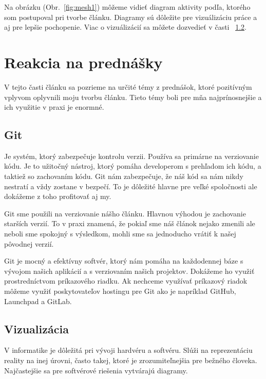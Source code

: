 \documentclass[10pt,twoside,slovak,a4paper]{article}
\begin{document}
Na obrázku (Obr.~\ref{fig:mesh1}) môžeme vidieť diagram aktivity podľa, ktorého som postupoval pri tvorbe článku. Diagramy sú dôležite pre vizuálizáciu práce a aj pre lepšie pochopenie. Viac o vizuálizácií sa môžete dozvedieť v časti ~\ref{viz}.

\newpage


\hypertarget{reakcia-na-prednasky}{%
\section{\texorpdfstring{Reakcia na prednášky
}{Reakcia na prednášky }}\label{reakcia-na-prednasky}}

V tejto časti článku sa pozrieme na určité témy z prednášok, ktoré pozitívným vplyvom oplyvnili moju tvorbu článku. Tieto témy boli pre mňa najprínosnejšie a ich využitie v praxi je enormné.
\hypertarget{git}{%
\subsection{Git}\label{git}}

Je systém, ktorý zabezpečuje kontrolu verzii. Používa sa primárne na verziovanie kódu. Je to užitočný nástroj, ktorý pomáha developerom s prehľadom ich kódu, a taktiež so zachovaním kódu. Git nám zabezpečuje, že náš kód sa nám nikdy nestratí a vždy zostane v bezpečí. To je dôležité hlavne pre veľké spoločnosti ale dokážeme z toho profitovať aj my. 

Git sme použili na verziovanie nášho článku. Hlavnou výhodou je zachovanie starších verzií. To v praxi znamená, že pokiaľ sme náš článok nejako zmenili ale neboli sme spokojný s výsledkom, mohli sme sa jednoducho vrátiť k našej pôvodnej verzií. 

Git je mocný a efektívny softvér, ktorý nám pomáha na každodennej báze s vývojom našich aplikácií a s verziovaním našich projektov. Dokážeme ho využiť prostredníctvom príkazového riadku. Ak nechceme využívať príkazový riadok môžeme využiť poskytovateľov hostingu pre Git ako je napríklad GitHub, Launchpad a GitLab.\cite{git}

\hypertarget{viz}{%
\subsection{Vizualizácia}\label{viz}}

V informatike je dôležitá pri vývoji hardvéru a softvéru. Slúži na reprezentáciu reality na inej úrovni, často takej, ktoré je zrozumiteľnejšia pre bežného človeka. Najčastejšie sa pre softvérové riešenia vytvárajú diagramy. 
\end{document}
